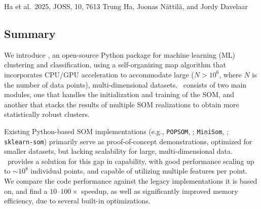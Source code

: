 \publicationdetailsnoabstract
{Ha et al.\ 2025, JOSS, 10, 7613}
{Trung Ha\footnotemark[1]\footnotemark[2]\footnotemark[3], Joonas Nättilä\footnotemark[4]\footnotemark[5]\footnotemark[2], and Jordy Davelaar\footnotemark[6]\footnotemark[7]\footnotemark[2]\footnotemark[5]}
{
}
\setcounter{footnote}{0}

\subsection{Summary}

We introduce \awesom, an open-source Python package for machine learning (ML) clustering and classification, using a self-organizing map \citep[SOM,][]{kohonen_self-organizing_1990} algorithm that incorporates CPU/GPU acceleration to accommodate large ($N > 10^6$, where $N$ is the number of data points), multi-dimensional datasets. \awesom\ consists of two main modules, one that handles the initialization and training of the SOM, and another that stacks the results of multiple SOM realizations to obtain more statistically robust clusters.

Existing Python-based SOM implementations (e.g., \texttt{POPSOM}, \citet{yuan_implementation_2018}; \texttt{MiniSom}, \citet{vettigli_minisom_2018}; \texttt{sklearn-som}) primarily serve as proof-of-concept demonstrations, optimized for smaller datasets, but lacking scalability for large, multi-dimensional data.
\awesom\ provides a solution for this gap in capability, with good performance scaling up to $\sim 10^8$ individual points, and capable of utilizing multiple features per point. We compare the code performance against the legacy implementations it is based on, and find a $10\text{--}100\times$ speedup, as well as significantly improved memory efficiency, due to several built-in optimizations.

